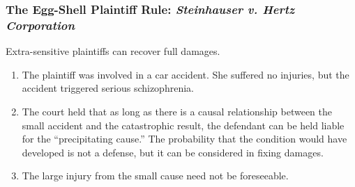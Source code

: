 \subsubsection{The Egg-Shell Plaintiff Rule: \emph{Steinhauser v. Hertz 
Corporation}}

Extra-sensitive plaintiffs can recover full damages.

\begin{enumerate}
    \item The plaintiff was involved in a car accident. She suffered no 
    injuries, but the accident triggered serious schizophrenia.
    \item The court held that as long as there is a causal relationship 
    between the small accident and the catastrophic result, the defendant can 
    be held liable for the ``precipitating cause.'' The probability that the 
    condition would have developed is not a defense, but it can be considered 
    in fixing damages.
    \item The large injury from the small cause need not be foreseeable.
\end{enumerate}

